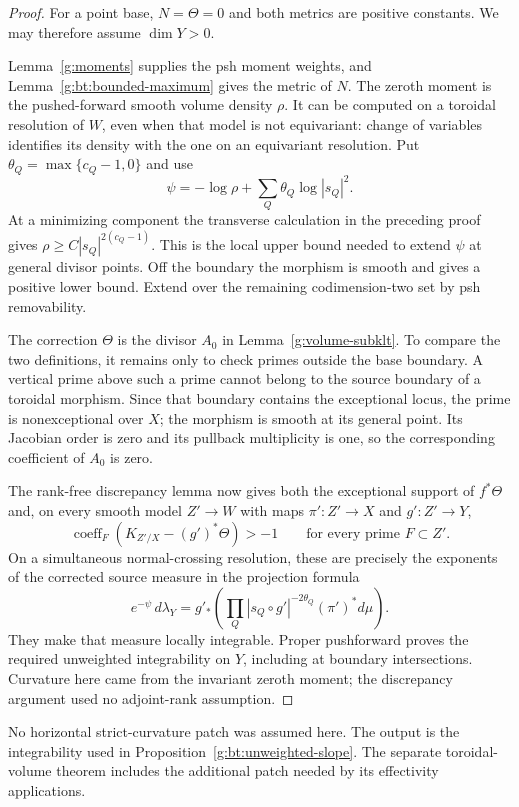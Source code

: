 \begin{proof}
For a point base, $N=\Theta=0$ and both metrics are positive constants.
We may therefore assume $\dim Y>0$.

Lemma~\ref{g:moments} supplies the psh moment weights, and
Lemma~\ref{g:bt:bounded-maximum} gives the metric of $N$.
The zeroth moment is the pushed-forward smooth volume density
$\rho$.  It can be computed on a toroidal resolution of $W$, even when
that model is not equivariant: change of variables identifies its
density with the one on an equivariant resolution.
Put $\theta_Q=\max\{c_Q-1,0\}$ and use
\[
                      \psi=-\log\rho+
                                   \sum_Q\theta_Q\log|s_Q|^2.
\]
At a minimizing component the transverse calculation in the preceding
proof gives $\rho\geq C|s_Q|^{2(c_Q-1)}$.  This is the local upper
bound needed to extend $\psi$ at general divisor points.
Off the boundary the morphism is smooth and gives a positive lower
bound.  Extend over the remaining codimension-two set by psh removability.

The correction $\Theta$ is the divisor $A_0$ in
Lemma~\ref{g:volume-subklt}. To compare the two definitions, it remains
only to check primes outside the base boundary. A vertical prime above
such a prime cannot belong to the source boundary of a toroidal
morphism. Since that boundary contains the exceptional locus, the
prime is nonexceptional over $X$; the morphism is smooth at its general
point. Its Jacobian order is zero and its pullback multiplicity is one,
so the corresponding coefficient of $A_0$ is zero.

The rank-free discrepancy lemma now gives both the exceptional support
of $f^*\Theta$ and, on every smooth model $Z'\to W$ with maps
$\pi':Z'\to X$ and $g':Z'\to Y$,
\[
       \operatorname{coeff}_F(K_{Z'/X}-(g')^*\Theta)>-1
                         \qquad\text{for every prime }F\subset Z'.
\]
On a simultaneous normal-crossing resolution, these are precisely the
exponents of the corrected source measure in the projection formula
\[
 e^{-\psi}\,d\lambda_Y
   =g'_*\left(\prod_Q|s_Q\circ g'|^{-2\theta_Q}
                                  (\pi')^*d\mu\right).
\]
They make that measure locally integrable. Proper pushforward proves
the required unweighted integrability on $Y$, including at boundary
intersections. Curvature here came from the invariant zeroth moment;
the discrepancy argument used no adjoint-rank assumption.
\end{proof}

No horizontal strict-curvature patch was assumed here.
The output is the integrability used in
Proposition~\ref{g:bt:unweighted-slope}.  The separate toroidal-volume
theorem includes the additional patch needed by its effectivity
applications.

